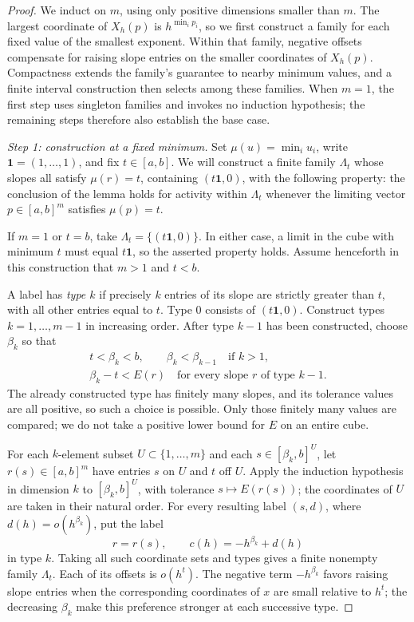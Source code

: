 \begin{proof}
We induct on $m$, using only positive dimensions smaller than $m$.
The largest coordinate of $X_h(p)$ is $h^{\min_i p_i}$, so we first
construct a family for each fixed value of the smallest exponent.
Within that family, negative offsets compensate for raising slope entries
on the smaller coordinates of $X_h(p)$.
Compactness extends the family's guarantee to nearby minimum
values, and a finite interval construction then selects among these
families. When $m=1$, the first step
uses singleton families and invokes no induction hypothesis; the remaining
steps therefore also establish the base case.

\medskip
\noindent\emph{Step 1: construction at a fixed minimum.}
Set $\mu(u)=\min_i u_i$, write $\mathbf 1=(1,\ldots,1)$, and fix
$t\in[a,b]$.  We will construct a finite
family $\Lambda_t$ whose slopes all satisfy $\mu(r)=t$, containing
$(t\mathbf 1,0)$, with the following property: the conclusion of the lemma
holds for activity within $\Lambda_t$ whenever the limiting vector
$p\in[a,b]^m$ satisfies $\mu(p)=t$.

If $m=1$ or $t=b$, take $\Lambda_t=\{(t\mathbf 1,0)\}$.  In either
case, a limit in the cube with minimum $t$ must equal $t\mathbf 1$, so
the asserted property holds.  Assume henceforth in this construction that
$m>1$ and $t<b$.

A label has \emph{type $k$} if precisely $k$ entries of its slope are
strictly greater than $t$, with all other entries equal to $t$.  Type $0$
consists of $(t\mathbf 1,0)$.  Construct types $k=1,\ldots,m-1$ in
increasing order.  After type $k-1$ has been constructed, choose $\beta_k$
so that
\begin{gather*}
  t<\beta_k<b,\qquad
  \beta_k<\beta_{k-1}\quad\text{if }k>1,\\
  \beta_k-t<E(r)
  \quad\text{for every slope $r$ of type $k-1$.}
\end{gather*}
The already constructed type has finitely many slopes, and its tolerance
values are all positive, so such a choice is possible. Only those finitely
many values are compared; we do not take a positive lower bound for $E$
on an entire cube.

For each $k$-element subset $U\subset\{1,\ldots,m\}$ and each
$s\in[\beta_k,b]^U$, let $r(s)\in[a,b]^m$ have entries $s$ on $U$ and
$t$ off $U$.  Apply the induction hypothesis in dimension $k$ to
$[\beta_k,b]^U$, with tolerance $s\mapsto E(r(s))$; the coordinates of
$U$ are taken in their natural order.  For every resulting label $(s,d)$,
where $d(h)=o(h^{\beta_k})$, put the label
\[
  r=r(s),\qquad c(h)=-h^{\beta_k}+d(h)
\]
in type $k$.  Taking all such coordinate sets and types gives a finite
nonempty family $\Lambda_t$.  Each of its offsets is $o(h^t)$.
The negative term $-h^{\beta_k}$ favors raising slope entries when
the corresponding coordinates of $x$ are small relative to $h^t$; the decreasing
$\beta_k$ make this preference stronger at each successive type.


\end{proof}
